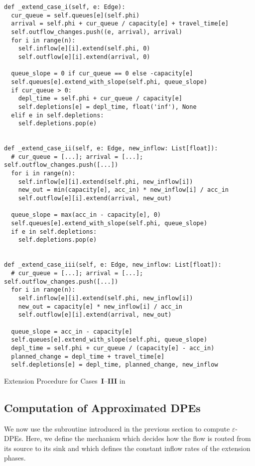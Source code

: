 \begin{algorithm}
    \begin{verbatim}
def _extend_case_i(self, e: Edge):
  cur_queue = self.queues[e](self.phi)
  arrival = self.phi + cur_queue / capacity[e] + travel_time[e]
  self.outflow_changes.push((e, arrival), arrival)
  for i in range(n):
    self.inflow[e][i].extend(self.phi, 0)
    self.outflow[e][i].extend(arrival, 0)

  queue_slope = 0 if cur_queue == 0 else -capacity[e]
  self.queues[e].extend_with_slope(self.phi, queue_slope)
  if cur_queue > 0:
    depl_time = self.phi + cur_queue / capacity[e]
    self.depletions[e] = depl_time, float('inf'), None
  elif e in self.depletions:
    self.depletions.pop(e)


def _extend_case_ii(self, e: Edge, new_inflow: List[float]):
  # cur_queue = [...]; arrival = [...]; self.outflow_changes.push([...])
  for i in range(n):
    self.inflow[e][i].extend(self.phi, new_inflow[i])
    new_out = min(capacity[e], acc_in) * new_inflow[i] / acc_in
    self.outflow[e][i].extend(arrival, new_out)

  queue_slope = max(acc_in - capacity[e], 0)
  self.queues[e].extend_with_slope(self.phi, queue_slope)
  if e in self.depletions:
    self.depletions.pop(e)


def _extend_case_iii(self, e: Edge, new_inflow: List[float]):
  # cur_queue = [...]; arrival = [...]; self.outflow_changes.push([...])
  for i in range(n):
    self.inflow[e][i].extend(self.phi, new_inflow[i])
    new_out = capacity[e] * new_inflow[i] / acc_in
    self.outflow[e][i].extend(arrival, new_out)

  queue_slope = acc_in - capacity[e]
  self.queues[e].extend_with_slope(self.phi, queue_slope)
  depl_time = self.phi + cur_queue / (capacity[e] - acc_in)
  planned_change = depl_time + travel_time[e]
  self.depletions[e] = depl_time, planned_change, new_inflow
\end{verbatim}
\caption{Extension Procedure for Cases~\textbf{I}--\textbf{III} in }
\label{alg:extend-cases}
\end{algorithm}


\subsection{Computation of Approximated DPEs}

We now use the subroutine introduced in the previous section to compute $\varepsilon$-DPEs.
Here, we define the mechanism which decides how the flow is routed from its source to its sink and which defines the constant inflow rates of the extension phases.

